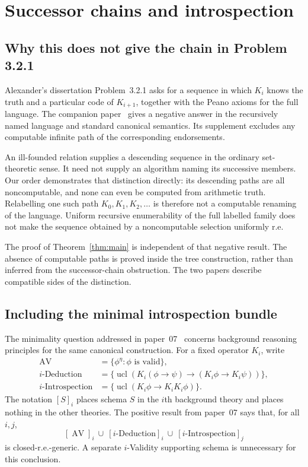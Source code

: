 \documentclass[11pt]{article}
\theoremstyle{definition}
\newcommand{\ucl}{\operatorname{ucl}}
\begin{document}
\section{Successor chains and introspection}\label{sec:comparison}

\subsection{Why this does not give the chain in Problem 3.2.1}

Alexander's dissertation Problem~3.2.1 asks for a sequence in which
$K_i$ knows the truth and a particular code of $K_{i+1}$, together with
the Peano axioms for the full language. The companion
paper~\cite{successor} gives a negative answer in the recursively named
language and standard canonical semantics. Its supplement excludes any
computable infinite path of the corresponding endorsements.

An ill-founded relation supplies a descending sequence in the ordinary
set-theoretic sense. It need not supply an algorithm naming its
successive members. Our order demonstrates that distinction directly:
its descending paths are all noncomputable, and none can even be
computed from arithmetic truth. Relabelling one such path
$K_0,K_1,K_2,\ldots$ is therefore not a computable renaming of the
language. Uniform recursive enumerability of the full labelled family
does not make the sequence obtained by a noncomputable selection
uniformly r.e.

The proof of Theorem~\ref{thm:main} is independent of that negative
result. The absence of computable paths is proved inside the tree
construction, rather than inferred from the successor-chain obstruction.
The two papers describe compatible sides of the distinction.

\subsection{Including the minimal introspection bundle}\label{subsec:introspection}

The minimality question addressed in paper~07~\cite{minimal} concerns
background reasoning principles for the same canonical construction.
For a fixed operator $K_i$, write
\[
 \begin{aligned}
 \operatorname{AV}&=\{\phi^\eta:\phi\text{ is valid}\},\\
 i\text{-Deduction}&=
 \{\ucl(K_i(\phi\to\psi)\to(K_i\phi\to K_i\psi))\},\\
 i\text{-Introspection}&=
 \{\ucl(K_i\phi\to K_iK_i\phi)\}.
 \end{aligned}
\]
The notation $[S]_i$ places schema $S$ in the $i$th background theory and
places nothing in the other theories. The positive result from paper~07
says that, for all $i,j$,
\begin{equation}\label{eq:minimal-bundle}
 [\operatorname{AV}]_i\ \cup\
 [i\text{-Deduction}]_i\ \cup\
 [i\text{-Introspection}]_j
\end{equation}
is closed-r.e.-generic. A separate $i$-Validity supporting schema is
unnecessary for this conclusion.
\end{document}
